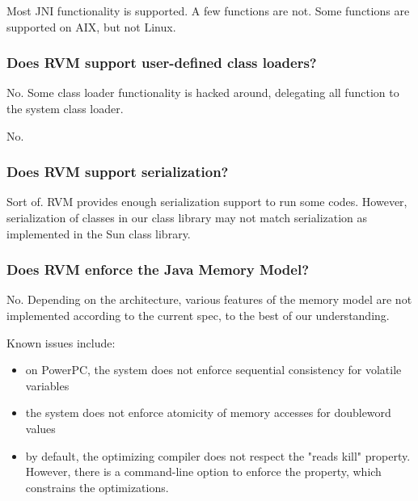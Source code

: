 Most JNI functionality is supported. A few functions are not. 
Some functions are supported on AIX\AIXTMFootnote,
but not Linux.

\subsubsection{Does RVM support user-defined class loaders?}

No. Some class loader functionality is hacked around, delegating all
function to the system class loader.  



No. 

\subsubsection{Does RVM support serialization?}

Sort of.  RVM provides enough serialization support to run some codes.  
However, serialization of classes in our class library may not match
serialization as implemented in the Sun class library.

\subsubsection{Does RVM enforce the Java Memory Model?}

No. Depending on the architecture, various features of the memory model
are not implemented according to the current spec, to the best of our
understanding.

Known issues include:
\begin{itemize}
\item on PowerPC\PowerPCTMFootnote, the system does not enforce
sequential consistency for 
volatile variables
\item the system does not enforce atomicity of memory accesses for
doubleword values
\item by default, the optimizing compiler does not respect the "reads
kill" property.  However, there is a command-line option to enforce the
property, which constrains the optimizations.
\end{itemize}


